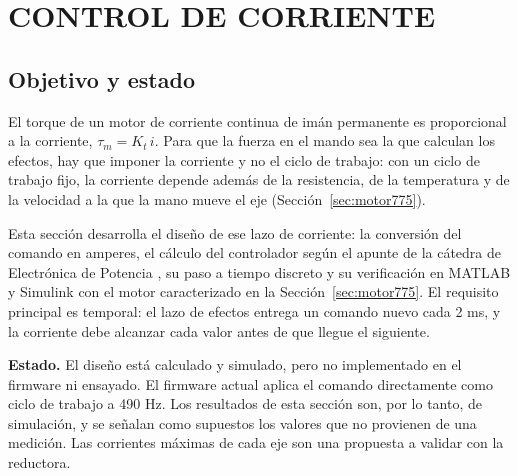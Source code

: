 \section{CONTROL DE CORRIENTE}
\label{sec:control_corriente}

\subsection{Objetivo y estado}
\label{sec:cc_objetivo}
El torque de un motor de corriente continua de imán permanente es proporcional a la corriente, $\tau_m = K_t\,i$. Para que la fuerza en el mando sea la que calculan los efectos, hay que imponer la corriente y no el ciclo de trabajo: con un ciclo de trabajo fijo, la corriente depende además de la resistencia, de la temperatura y de la velocidad a la que la mano mueve el eje (Sección~\ref{sec:motor775}).

Esta sección desarrolla el diseño de ese lazo de corriente: la conversión del comando en amperes, el cálculo del controlador según el apunte de la cátedra de Electrónica de Potencia \cite{oros2010}, su paso a tiempo discreto y su verificación en MATLAB y Simulink con el motor caracterizado en la Sección~\ref{sec:motor775}. El requisito principal es temporal: el lazo de efectos entrega un comando nuevo cada 2 ms, y la corriente debe alcanzar cada valor antes de que llegue el siguiente.

\textbf{Estado.} El diseño está calculado y simulado, pero no implementado en el firmware ni ensayado. El firmware actual aplica el comando directamente como ciclo de trabajo a 490 Hz. Los resultados de esta sección son, por lo tanto, de simulación, y se señalan como supuestos los valores que no provienen de una medición. Las corrientes máximas de cada eje son una propuesta a validar con la reductora.


